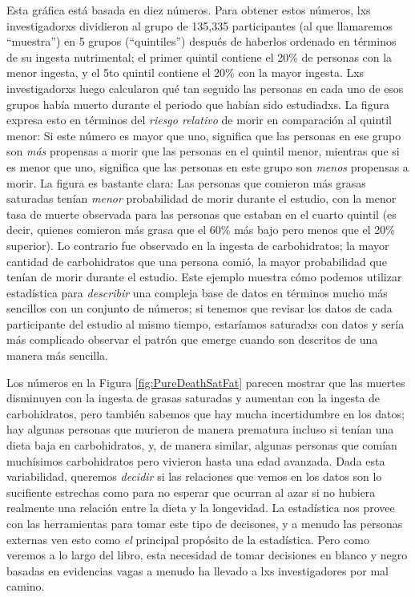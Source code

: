 \documentclass[
  12pt,
]{book}
\begin{document}
Esta gráfica está basada en diez números. Para obtener estos números, lxs investigadorxs dividieron al grupo de 135,335 participantes (al que llamaremos ``muestra'') en 5 grupos (``quintiles'') después de haberlos ordenado en términos de su ingesta nutrimental; el primer quintil contiene el 20\% de personas con la menor ingesta, y el 5to quintil contiene el 20\% con la mayor ingesta. Lxs investigadorxs luego calcularon qué tan seguido las personas en cada uno de esos grupos había muerto durante el periodo que habían sido estudiadxs. La figura expresa esto en términos del \emph{riesgo relativo} de morir en comparación al quintil menor: Si este número es mayor que uno, significa que las personas en ese grupo son \emph{más} propensas a morir que las personas en el quintil menor, mientras que si es menor que uno, significa que las personas en este grupo son \emph{menos} propensas a morir. La figura es bastante clara: Las personas que comieron más grasas saturadas tenían \emph{menor} probabilidad de morir durante el estudio, con la menor tasa de muerte observada para las personas que estaban en el cuarto quintil (es decir, quienes comieron más grasa que el 60\% más bajo pero menos que el 20\% superior). Lo contrario fue observado en la ingesta de carbohidratos; la mayor cantidad de carbohidratos que una persona comió, la mayor probabilidad que tenían de morir durante el estudio. Este ejemplo muestra cómo podemos utilizar estadística para \emph{describir} una compleja base de datos en términos mucho más sencillos con un conjunto de números; si tenemos que revisar los datos de cada participante del estudio al mismo tiempo, estaríamos saturadxs con datos y sería más complicado observar el patrón que emerge cuando son descritos de una manera más sencilla.

Los números en la Figura \ref{fig:PureDeathSatFat} parecen mostrar que las muertes disminuyen con la ingesta de grasas saturadas y aumentan con la ingesta de carbohidratos, pero también sabemos que hay mucha incertidumbre en los datos; hay algunas personas que murieron de manera prematura incluso si tenían una dieta baja en carbohidratos, y, de manera similar, algunas personas que comían muchísimos carbohidratos pero vivieron hasta una edad avanzada. Dada esta variabilidad, queremos \emph{decidir} si las relaciones que vemos en los datos son lo sucifiente estrechas como para no esperar que ocurran al azar si no hubiera realmente una relación entre la dieta y la longevidad. La estadística nos provee con las herramientas para tomar este tipo de decisones, y a menudo las personas externas ven esto como \emph{el} principal propósito de la estadística. Pero como veremos a lo largo del libro, esta necesidad de tomar decisiones en blanco y negro basadas en evidencias vagas a menudo ha llevado a lxs investigadores por mal camino.
\end{document}
